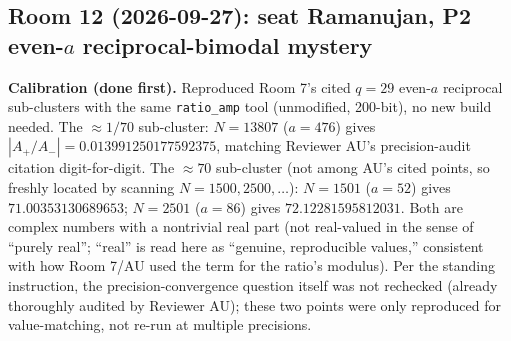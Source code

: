 \subsection*{Room 12 (2026-09-27): seat Ramanujan, P2 even-$a$ reciprocal-bimodal mystery}

\textbf{Calibration (done first).} Reproduced Room 7's cited $q=29$ even-$a$ reciprocal
sub-clusters with the same \texttt{ratio\_amp} tool (unmodified, 200-bit), no new build needed.
The $\approx1/70$ sub-cluster: $N=13807$ ($a=476$) gives $|A_+/A_-|=0.013991250177592375$,
matching Reviewer AU's precision-audit citation digit-for-digit. The $\approx70$ sub-cluster
(not among AU's cited points, so freshly located by scanning $N=1500,2500,\dots$): $N=1501$
($a=52$) gives $71.00353130689653$; $N=2501$ ($a=86$) gives $72.12281595812031$. Both are complex
numbers with a nontrivial real part (not real-valued in the sense of ``purely real''; ``real'' is
read here as ``genuine, reproducible values,'' consistent with how Room 7/AU used the term for
the ratio's modulus). Per the standing instruction, the precision-convergence question itself was
not rechecked (already thoroughly audited by Reviewer AU); these two points were only reproduced
for value-matching, not re-run at multiple precisions.

